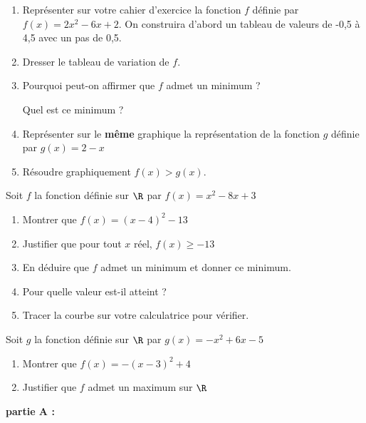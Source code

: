 \medskip

\exo 

\begin{enumerate}
\item Représenter sur votre cahier d'exercice la fonction $f$ définie par $f(x)= 2x^2 - 6x + 2$. On construira d'abord un tableau de valeurs de -0,5 à 4,5 avec un pas de 0,5.
\item Dresser le tableau de variation de $f$.
\item Pourquoi peut-on affirmer que $f$ admet un minimum ? 

Quel est ce minimum ?
\item Représenter sur le \textbf{même} graphique la représentation de la fonction $g$ définie par $g(x)= 2-x$
\item Résoudre graphiquement $f(x)> g(x)$.
\end{enumerate}


\exo

Soit $f$ la fonction définie sur $\R$ par $f(x)= x^2-8x+3$

\begin{enumerate}
\item Montrer que $f(x)=(x-4)^2 - 13$
\item Justifier que pour tout $x$ réel, $f(x) \geqslant -13$
\item En déduire que $f$ admet un minimum et donner ce minimum. 
\item Pour quelle valeur est-il atteint ?
\item Tracer la courbe sur votre calculatrice pour vérifier.
\end{enumerate}

\medskip

\exo

Soit $g$ la fonction définie sur $\R$ par $g(x)= -x^2 +6x -5$
\begin{enumerate}
\item Montrer que $f(x)= -(x-3)^2 + 4$
\item Justifier que $f$ admet un maximum sur $\R$
\end{enumerate}

\medskip

\exo

\textbf{partie A :}

\medskip

